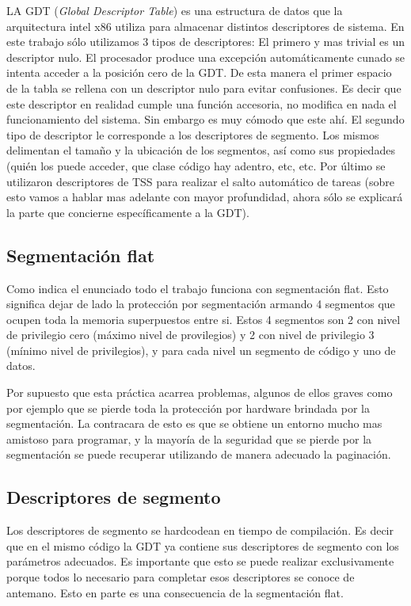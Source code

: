 	LA GDT (\textit{Global Descriptor Table})  es una estructura de datos
que la arquitectura intel x86 utiliza para almacenar distintos descriptores
de sistema. En este trabajo sólo utilizamos 3 tipos de descriptores: El
primero y mas trivial es un descriptor nulo. El procesador produce
una excepción automáticamente cunado se intenta acceder a la posición cero
de la GDT. De esta manera el primer espacio de la tabla se rellena con
un descriptor nulo para evitar confusiones. Es decir que este descriptor
en realidad cumple una función accesoria, no modifica en nada el funcionamiento
del sistema. Sin embargo es muy cómodo que este ahí. El segundo tipo
de descriptor le corresponde a los descriptores de segmento. Los mismos
delimentan el tamaño y la ubicación de los segmentos, así como sus propiedades
(quién los puede acceder, que clase código hay adentro, etc, etc. Por último
se utilizaron descriptores de TSS para realizar el salto automático de tareas
(sobre esto vamos a hablar mas adelante con mayor profundidad, ahora sólo
se explicará la parte que concierne específicamente a la GDT).

\subsection{Segmentación flat}

	Como indica el enunciado todo el trabajo funciona con segmentación flat.
Esto significa dejar de lado la protección por segmentación armando 4 segmentos
que ocupen toda la memoria superpuestos entre si. Estos 4 segmentos son 2
con nivel de privilegio cero (máximo nivel de provilegios) y 2 con nivel de privilegio
3 (mínimo nivel de privilegios), y para cada nivel un segmento de código y uno
de datos.

	Por supuesto que esta práctica acarrea problemas, algunos de ellos graves
como por ejemplo que se pierde toda la protección por hardware brindada
por la segmentación. La contracara de esto es que se obtiene un entorno
mucho mas amistoso para programar, y la mayoría de la seguridad que se pierde
por la segmentación se puede recuperar utilizando de manera adecuado la paginación.

\subsection{Descriptores de segmento}

	Los descriptores de segmento se hardcodean en tiempo de compilación. Es decir
que en el mismo código la GDT ya contiene sus descriptores de segmento con
los parámetros adecuados. Es importante que esto se puede realizar exclusivamente
porque todos lo necesario para completar esos descriptores se conoce de antemano.
Esto en parte es una consecuencia de la segmentación flat.

